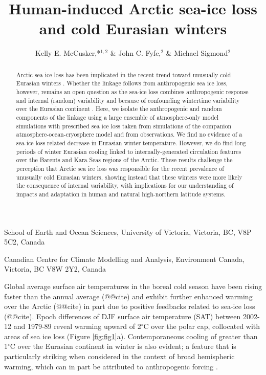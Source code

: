 \documentclass{nature}
\title{Human-induced Arctic sea-ice loss and cold Eurasian winters}
\author{Kelly E. McCusker,*$^{1,2}$ \& John C. Fyfe,$^{2}$ \& Michael Sigmond$^2$}
\begin{document}
\maketitle

\begin{affiliations}
 \item School of Earth and Ocean Sciences, University of Victoria, Victoria, BC, V8P 5C2, Canada
 \item Canadian Centre for Climate Modelling and Analysis, Environment Canada, Victoria, BC V8W 2Y2, Canada
\end{affiliations}


\begin{abstract}
Arctic sea ice loss has been implicated in the recent trend toward unusually cold Eurasian winters \cite{liu12,mori14,kim14}. Whether the linkage follows from anthropogenic sea ice loss, however, remains an open question as the sea-ice loss combines anthropogenic response and internal (random) variability \cite{swart15,wettstein14} and because of confounding wintertime variability over the Eurasian continent \cite{deser12b,screen14a}. Here, we isolate the anthropogenic and random components of the linkage using a large ensemble of atmosphere-only model simulations with prescribed sea ice loss taken from simulations of the companion atmosphere-ocean-cryosphere model and from observations. We find no evidence of a sea-ice loss related decrease in Eurasian winter temperature. However, we do find long periods of winter Eurasian cooling linked to internally-generated circulation features over the Barents and Kara Seas regions of the Arctic. These results challenge the perception that Arctic sea ice loss was responsible for the recent prevalence of unusually cold Eurasian winters, showing instead that these winters were more likely the consequence of internal variability, with implications for our understanding of impacts and adaptation in human and natural high-northern latitude systems. %
\end{abstract}

Global average surface air temperatures in the boreal cold season have been rising faster than the annual average (@@cite) and exhibit further enhanced warming over the Arctic (@@cite) in part due to positive feedbacks related to sea-ice loss (@@cite). Epoch differences of DJF surface air temperature (SAT) between 2002-12 and 1979-89 reveal warming upward of 2$^\circ$C over the polar cap, collocated with areas of sea ice loss (Figure \ref{fig:fig1}a). Contemporaneous cooling of greater than 1$^\circ$C over the Eurasian continent in winter is also evident; a feature that is particularly striking when considered in the context of broad hemispheric warming, which can in part be attributed to anthropogenic forcing \cite{qian15}. %
\end{document}
